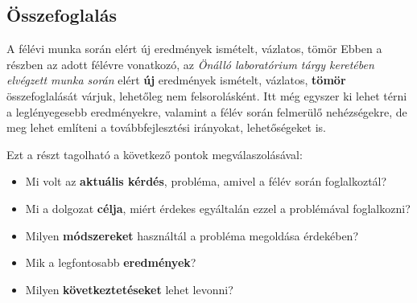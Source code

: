 \documentclass[a4paper,oneside]{article}
\begin{document}
%
%
%
%

\subsection{Összefoglalás}
\label{sec:osszefoglalas}

A félévi munka során elért új eredmények ismételt, vázlatos, tömör
Ebben a részben az adott félévre vonatkozó, az \emph{Önálló
  laboratórium tárgy keretében elvégzett munka során} elért
\textbf{új} eredmények ismételt, vázlatos, \textbf{tömör}
összefoglalását várjuk, lehetőleg nem felsorolásként.  Itt még egyszer
ki lehet térni a leglényegesebb eredményekre, valamint a félév során
felmerülő nehézségekre, de meg lehet említeni a továbbfejlesztési
irányokat, lehetőségeket is.

Ezt a részt tagolható a következő pontok megválaszolásával:
\begin{itemize}
\item Mi volt az \textbf{aktuális kérdés}, probléma, amivel a félév
  során foglalkoztál?
\item Mi a dolgozat \textbf{célja}, miért érdekes egyáltalán ezzel a
  problémával foglalkozni?
\item Milyen \textbf{módszereket} használtál a probléma megoldása
  érdekében?
\item Mik a legfontosabb \textbf{eredmények}?
\item Milyen \textbf{következtetéseket} lehet levonni?

\end{itemize}
\end{document}
